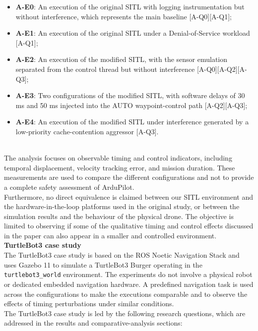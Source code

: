 \begin{itemize}[nosep]
    \item \textbf{A-E0}: An execution of the original SITL with logging instrumentation but without interference, which represents the main baseline [A-Q0][A-Q1];
    \item \textbf{A-E1}: An execution of the original SITL under a Denial-of-Service workload [A-Q1];
    \item \textbf{A-E2}: An execution of the modified SITL, with the sensor emulation separated from the control thread but without interference [A-Q0][A-Q2][A-Q3];
    \item \textbf{A-E3}: Two configurations of the modified SITL, with software delays of 30 ms and 50 ms injected into the AUTO waypoint-control path [A-Q2][A-Q3];
    \item \textbf{A-E4}: An execution of the modified SITL under interference generated by a low-priority cache-contention aggressor [A-Q3].
\end{itemize}
\\
The analysis focuses on observable timing and control indicators, including temporal displacement, velocity tracking error, and mission duration. These measurements are used to compare the different configurations and not to provide a complete safety assessment of ArduPilot.
\\
Furthermore, no direct equivalence is claimed between our SITL environment and the hardware-in-the-loop platforms used in the original study, or between the simulation results and the behaviour of the physical drone. The objective is limited to observing if some of the qualitative timing and control effects discussed in the paper can also appear in a smaller and controlled environment.
\\
\textbf{TurtleBot3 case study}\\
The TurtleBot3 case study is based on the ROS Noetic Navigation Stack and uses Gazebo 11 to simulate a TurtleBot3 Burger operating in the \texttt{turtlebot3\_world} environment. The experiments do not involve a physical robot or dedicated embedded navigation hardware. A predefined navigation task is used across the configurations to make the executions comparable and to observe the effects of timing perturbations under similar conditions.
\\
The TurtleBot3 case study is led by the following research questions, which are addressed in the results and comparative-analysis sections:
